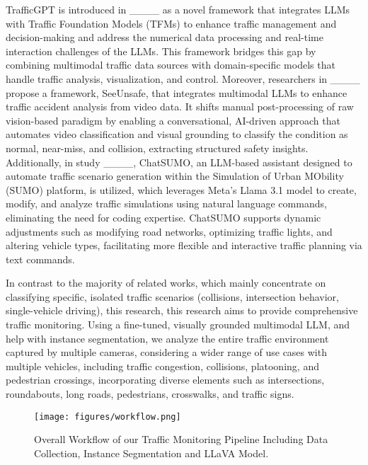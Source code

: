 TrafficGPT is introduced in ____ as a novel framework that integrates LLMs with Traffic Foundation Models (TFMs) to enhance traffic management and decision-making and address the numerical data processing and real-time interaction challenges of the LLMs. This framework bridges this gap by combining multimodal traffic data sources with domain-specific models that handle traffic analysis, visualization, and control. Moreover, researchers in ____ propose a framework, SeeUnsafe, that integrates multimodal LLMs to enhance traffic accident analysis from video data. It shifts manual post-processing of raw vision-based paradigm by enabling a conversational, AI-driven approach that automates video classification and visual grounding to classify the condition as normal, near-miss, and collision, extracting structured safety insights. Additionally, in study ____, ChatSUMO, an LLM-based assistant designed to automate traffic scenario generation within the Simulation of Urban MObility (SUMO) platform, is utilized, which leverages Meta's Llama 3.1 model to create, modify, and analyze traffic simulations using natural language commands, eliminating the need for coding expertise. ChatSUMO supports dynamic adjustments such as modifying road networks, optimizing traffic lights, and altering vehicle types, facilitating more flexible and interactive traffic planning via text commands. 

In contrast to the majority of related works, which mainly concentrate on classifying specific, isolated traffic scenarios (collisions, intersection behavior, single-vehicle driving), this research, this research aims to provide comprehensive traffic monitoring. Using a fine-tuned, visually grounded multimodal LLM, and help with instance segmentation, we analyze the entire traffic environment captured by multiple cameras, considering a wider range of use cases with multiple vehicles, including traffic congestion, collisions, platooning, and pedestrian crossings, incorporating diverse elements such as intersections, roundabouts, long roads, pedestrians, crosswalks, and traffic signs.

\begin{figure*} [t]
    \centering
    \texttt{[image: figures/workflow.png]}
    \caption{Overall Workflow of our Traffic Monitoring Pipeline Including Data Collection, Instance Segmentation and LLaVA Model.}
    \label{fig: workflow}
\end{figure*}
